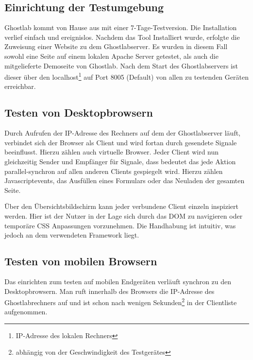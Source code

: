 		\subsection {Einrichtung der Testumgebung}
		Ghostlab kommt von Hause aus mit einer 7-Tage-Testversion. Die Installation verlief einfach und ereignislos. Nachdem das 		Tool Installiert wurde, erfolgte die Zuweisung einer Website zu dem Ghostlabserver. Es wurden in diesem Fall sowohl eine 		Seite auf einem lokalen Apache Server getestet, als auch die mitgelieferte Demoseite von Ghostlab. Nach dem Start des 			Ghostlabservers ist dieser über den localhost\footnote{IP-Adresse des lokalen Rechners} auf Port 8005 (Default) von allen 		zu testenden Geräten erreichbar.
		
		\subsection{Testen von Desktopbrowsern}
		Durch Aufrufen der IP-Adresse des Rechners auf dem der Ghostlabserver läuft, verbindet sich der Browser als Client und 			wird fortan durch gesendete Signale beeinflusst. Hierzu zählen auch virtuelle Browser. Jeder Client wird nun gleichzeitig 			Sender und Empfänger für Signale, dass bedeutet das jede Aktion parallel-synchron auf allen anderen Clients gespiegelt 			wird. Hierzu zählen Javascriptevents, das Ausfüllen eines Formulars oder das Neuladen der gesamten Seite.
		
		Über den Übersichtsbildschirm kann jeder verbundene Client einzeln inspiziert werden. Hier ist der Nutzer in der Lage sich 		durch das DOM zu navigieren oder temporäre CSS Anpassungen vorzunehmen. Die Handhabung ist intuitiv, was jedoch an 		dem verwendeten Framework  liegt.
		
		\pagebreak
		\subsection{Testen von mobilen Browsern}
		
		Das einrichten zum testen auf mobilen Endgeräten verläuft synchron zu den Desktopbrowsern. Man ruft innerhalb des 			Browsers die IP-Adresse des Ghostlabrechners auf und ist schon nach wenigen Sekunden\footnote{abhängig von der 			Geschwindigkeit des Testgerätes} in der Clientliste aufgenommen.
		
